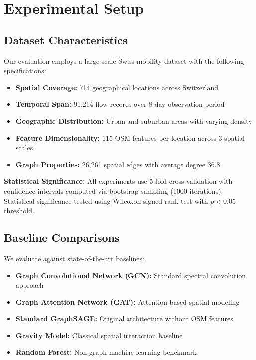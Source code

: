 \documentclass[twocolumn,11pt]{IEEEtran}  %
\begin{document}
\section{Experimental Setup}

\subsection{Dataset Characteristics}

Our evaluation employs a large-scale Swiss mobility dataset with the following specifications:
\begin{itemize}
\item \textbf{Spatial Coverage:} 714 geographical locations across Switzerland
\item \textbf{Temporal Span:} 91,214 flow records over 8-day observation period
\item \textbf{Geographic Distribution:} Urban and suburban areas with varying density
\item \textbf{Feature Dimensionality:} 115 OSM features per location across 3 spatial scales
\item \textbf{Graph Properties:} 26,261 spatial edges with average degree 36.8
\end{itemize}

\textbf{Statistical Significance:} All experiments use 5-fold cross-validation with confidence intervals computed via bootstrap sampling (1000 iterations). Statistical significance tested using Wilcoxon signed-rank test with $p < 0.05$ threshold.

\subsection{Baseline Comparisons}

We evaluate against state-of-the-art baselines:
\begin{itemize}
\item \textbf{Graph Convolutional Network (GCN):} Standard spectral convolution approach
\item \textbf{Graph Attention Network (GAT):} Attention-based spatial modeling
\item \textbf{Standard GraphSAGE:} Original architecture without OSM features
\item \textbf{Gravity Model:} Classical spatial interaction baseline
\item \textbf{Random Forest:} Non-graph machine learning benchmark
\end{itemize}
\end{document}

